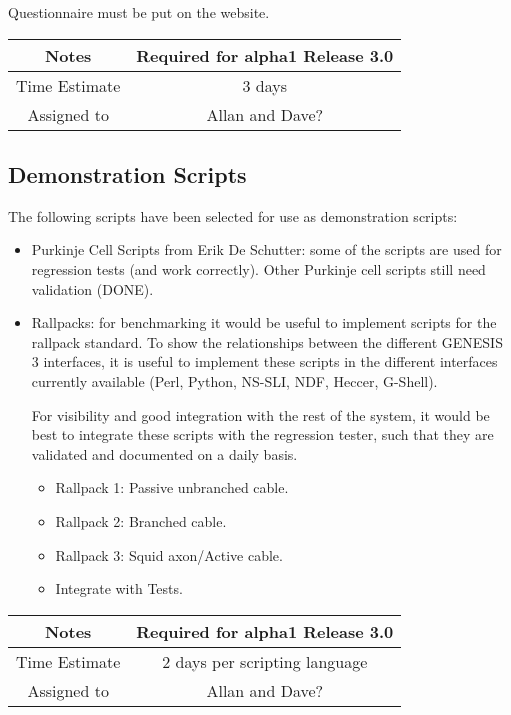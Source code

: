 \documentclass[12pt]{article}
\begin{document}
Questionnaire must be put on the website.


{
  \vspace{5mm}
  \centering
  \begin{tabular}{|c|c|}
    \hline
    Notes
    & Required for alpha1 Release 3.0 \\
    \hline
    Time Estimate
    & 3 days \\
    \hline
    Assigned to
    &  Allan and Dave? \\
    \hline
  \end{tabular}
}

\subsection{Demonstration Scripts}

The following scripts have been selected for use as demonstration
scripts:

\begin{itemize}
\item Purkinje Cell Scripts from Erik De Schutter: some of the scripts
  are used for regression tests (and work correctly).  Other Purkinje
  cell scripts still need validation (DONE).
\item Rallpacks: for benchmarking it would be useful to implement
  scripts for the rallpack standard.  To show the relationships
  between the different GENESIS\,3 interfaces, it is useful to
  implement these scripts in the different interfaces currently
  available (Perl, Python, NS-SLI, NDF, Heccer, G-Shell).

  For visibility and good integration with the rest of the system, it
  would be best to integrate these scripts with the regression tester,
  such that they are validated and documented on a daily basis.
  \begin{itemize}
  \item Rallpack 1: Passive unbranched cable.
  \item Rallpack 2: Branched cable.
  \item Rallpack 3: Squid axon/Active cable.
  \item Integrate with Tests.
  \end{itemize}
\end{itemize}

{
  \vspace{5mm}
  \centering
  \begin{tabular}{|c|c|}
    \hline
    Notes
    & Required for alpha1 Release 3.0 \\
    \hline
    Time Estimate
    & 2 days per scripting language \\
    \hline
    Assigned to
    & Allan and Dave? \\
    \hline
  \end{tabular}
}
\end{document}

